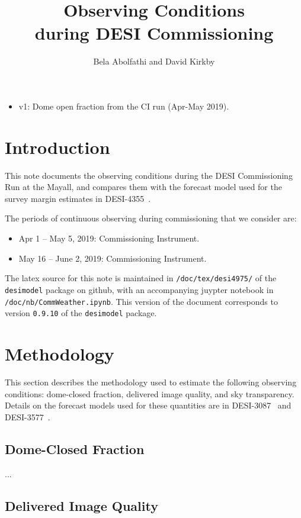 \documentclass[12pt]{article}
\title{Observing Conditions\\
during DESI Commissioning\\
\vspace{5mm}{\large\bf DESI-doc-4975-v1}}
\author{Bela Abolfathi and David Kirkby}
\begin{document}
\maketitle

\begin{itemize}
    \item v1: Dome open fraction from the CI run (Apr-May 2019).
\end{itemize}

\section{Introduction}

This note documents the observing conditions during the DESI Commissioning Run at the Mayall, and compares them
with the forecast model used for the survey margin estimates in DESI-4355~\cite{desi4355}.

The periods of continuous observing during commissioning that we consider are:
\begin{itemize}
\item Apr 1 -- May 5, 2019: Commissioning Instrument.
\item May 16 -- June 2, 2019: Commissioning Instrument.
\end{itemize}

The latex source for this note is maintained in {\tt /doc/tex/desi4975/} of the {\tt desimodel} package on github,
with an accompanying juypter notebook in {\tt /doc/nb/CommWeather.ipynb}. This version of the document corresponds to
version {\tt 0.9.10} of the {\tt desimodel} package.

\section{Methodology}

This section describes the methodology used to estimate the following observing conditions: dome-closed fraction,
delivered image quality, and sky transparency.  Details on the forecast models used for these quantities are in
DESI-3087~\cite{desi3087} and DESI-3577~\cite{desi3577}.

\subsection{Dome-Closed Fraction}

...

\subsection{Delivered Image Quality}
\end{document}
